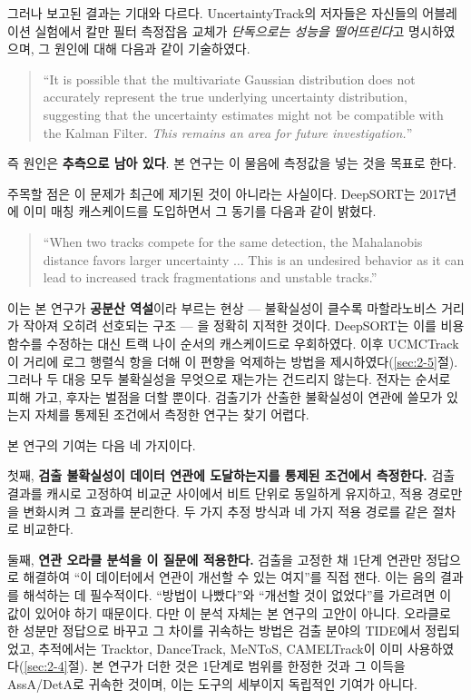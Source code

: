 \documentclass[12pt,a4paper,oneside]{report}
\begin{document}
그러나 보고된 결과는 기대와 다르다. UncertaintyTrack의 저자들은 자신들의 어블레이션 실험에서 칼만 필터 측정잡음 교체가 \textit{단독으로는 성능을 떨어뜨린다}고 명시하였으며, 그 원인에 대해 다음과 같이 기술하였다.

\begin{quote}
``It is possible that the multivariate Gaussian distribution does not accurately represent the true underlying uncertainty distribution, suggesting that the uncertainty estimates might not be compatible with the Kalman Filter. \textit{This remains an area for future investigation.}''\citep{lee2024}
\end{quote}

즉 원인은 \textbf{추측으로 남아 있다}. 본 연구는 이 물음에 측정값을 넣는 것을 목표로 한다.

주목할 점은 이 문제가 최근에 제기된 것이 아니라는 사실이다. DeepSORT는 2017년에 이미 매칭 캐스케이드를 도입하면서 그 동기를 다음과 같이 밝혔다.

\begin{quote}
``When two tracks compete for the same detection, the Mahalanobis distance favors larger uncertainty $\ldots$ This is an undesired behavior as it can lead to increased track fragmentations and unstable tracks.''\citep{wojke2017}
\end{quote}

이는 본 연구가 \textbf{공분산 역설}이라 부르는 현상 --- 불확실성이 클수록 마할라노비스 거리가 작아져 오히려 선호되는 구조 --- 을 정확히 지적한 것이다. DeepSORT는 이를 비용 함수를 수정하는 대신 트랙 나이 순서의 캐스케이드로 우회하였다. 이후 UCMCTrack\citep{yi2024}이 거리에 로그 행렬식 항을 더해 이 편향을 억제하는 방법을 제시하였다(\ref{sec:2-5}절). 그러나 두 대응 모두 불확실성을 무엇으로 재는가는 건드리지 않는다. 전자는 순서로 피해 가고, 후자는 벌점을 더할 뿐이다. 검출기가 산출한 불확실성이 연관에 쓸모가 있는지 자체를 통제된 조건에서 측정한 연구는 찾기 어렵다.

본 연구의 기여는 다음 네 가지이다.

첫째, \textbf{검출 불확실성이 데이터 연관에 도달하는지를 통제된 조건에서 측정한다.} 검출 결과를 캐시로 고정하여 비교군 사이에서 비트 단위로 동일하게 유지하고, 적용 경로만을 변화시켜 그 효과를 분리한다. 두 가지 추정 방식과 네 가지 적용 경로를 같은 절차로 비교한다.

둘째, \textbf{연관 오라클 분석을 이 질문에 적용한다.} 검출을 고정한 채 1단계 연관만 정답으로 해결하여 ``이 데이터에서 연관이 개선할 수 있는 여지''를 직접 잰다. 이는 음의 결과를 해석하는 데 필수적이다. ``방법이 나빴다''와 ``개선할 것이 없었다''를 가르려면 이 값이 있어야 하기 때문이다. 다만 이 분석 자체는 본 연구의 고안이 아니다. 오라클로 한 성분만 정답으로 바꾸고 그 차이를 귀속하는 방법은 검출 분야의 TIDE\citep{bolya2020}에서 정립되었고, 추적에서는 Tracktor\citep{bergmann2019}, DanceTrack\citep{sun2022}, MeNToS\citep{miah2023}, CAMELTrack\citep{somers2025}이 이미 사용하였다(\ref{sec:2-4}절). 본 연구가 더한 것은 1단계로 범위를 한정한 것과 그 이득을 AssA/DetA로 귀속한 것이며, 이는 도구의 세부이지 독립적인 기여가 아니다.
\end{document}
